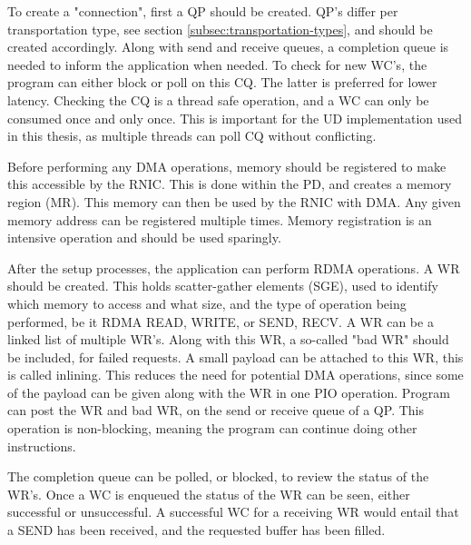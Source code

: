 To create a "connection", first a QP should be created.
QP's differ per transportation type, see section \ref{subsec:transportation-types}, and should be created accordingly.
Along with send and receive queues, a completion queue is needed to inform the application when needed.
To check for new WC's, the program can either block or poll on this CQ.
The latter is preferred for lower latency.
Checking the CQ is a thread safe operation, and a WC can only be consumed once and only once.
This is important for the UD implementation used in this thesis, as multiple threads can poll CQ without conflicting.

Before performing any DMA operations, memory should be registered to make this accessible by the RNIC.
This is done within the PD, and creates a memory region (MR).
This memory can then be used by the RNIC with DMA.
Any given memory address can be registered multiple times.
Memory registration is an intensive operation and should be used sparingly.

After the setup processes, the application can perform RDMA operations.
A WR should be created.
This holds scatter-gather elements (SGE), used to identify which memory to access and what size, and the type of operation being performed, be it RDMA READ, WRITE, or SEND, RECV.
A WR can be a linked list of multiple WR's.
Along with this WR, a so-called "bad WR" should be included, for failed requests.
A small payload can be attached to this WR, this is called inlining.
This reduces the need for potential DMA operations, since some of the payload can be given along with the WR in one PIO operation.
Program can post the WR and bad WR, on the send or receive queue of a QP.
This operation is non-blocking, meaning the program can continue doing other instructions.

The completion queue can be polled, or blocked, to review the status of the WR's.
Once a WC is enqueued the status of the WR can be seen, either successful or unsuccessful.
A successful WC for a receiving WR would entail that a SEND has been received, and the requested buffer has been filled.








